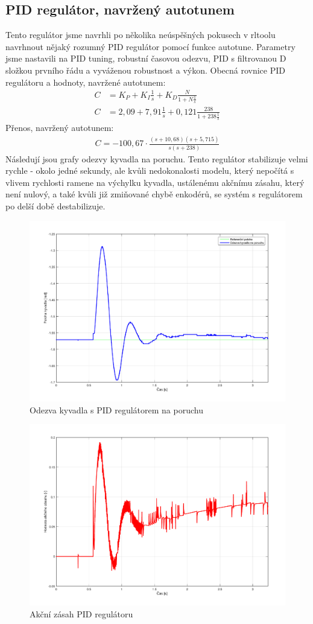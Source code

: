 \documentclass[a4paper,12pt]{article}
\begin{document}
\subsection{PID regulátor, navržený autotunem}
Tento regulátor jsme navrhli po několika neúspěšných pokusech v rltoolu navrhnout nějaký rozumný PID regulátor pomocí funkce autotune. Parametry jsme nastavili na PID tuning, robustní časovou odezvu, PID s filtrovanou D složkou prvního řádu a vyváženou robustnost a výkon.
\newline
Obecná rovnice PID regulátoru a hodnoty, navržené autotunem:
\begin{align*}
C &= K_P + K_I\frac{1}{s} + K_D\frac{N}{1+N\frac{1}{s}}	\\
C &= 2,09 + 7,91\frac{1}{s} + 0,121\frac{238}{1 + 238\frac{1}{s}}
\end{align*}
Přenos, navržený autotunem:
\begin{align*}
C = -100,67\cdot\frac{(s+10,68)(s+5,715)}{s(s+238)}
\end{align*}
Následují jsou grafy odezvy kyvadla na poruchu. Tento regulátor stabilizuje velmi rychle - okolo jedné sekundy, ale kvůli nedokonalosti modelu, který nepočítá s vlivem rychlosti ramene na výchylku kyvadla, ustálenému akčnímu zásahu, který není nulový, a také kvůli již zmiňované chybě enkodérů, se systém s regulátorem po delší době destabilizuje.
\begin{figure}[H]
	\centering
    \includegraphics[scale=0.55]{odezva_kyvadlo_PID}
    \caption{Odezva kyvadla s PID regulátorem na poruchu}
\end{figure}
\begin{figure}[H]
	\centering
    \includegraphics[scale=0.55]{odezva_kyvadlo_PID_akcnizasah}
    \caption{Akční zásah PID regulátoru}
\end{figure}
\end{document}
